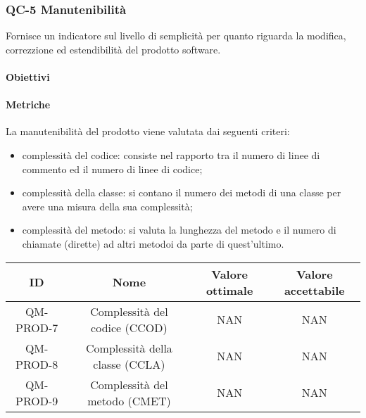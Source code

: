 \subsubsection{QC-5 Manutenibilità}
Fornisce un indicatore sul livello di semplicità per quanto riguarda la modifica, correzzione ed estendibilità del prodotto software.
	\paragraph{Obiettivi}
		
	\paragraph{Metriche}
	La manutenibilità del prodotto viene valutata dai seguenti criteri:
	\begin{itemize}
		\item complessità del codice: consiste nel rapporto tra il numero di linee di commento ed il numero di linee di codice;
		\item complessità della classe: si contano il numero dei metodi di una classe per avere una misura della sua complessità;
		\item complessità del metodo: si valuta la lunghezza del metodo e il numero di chiamate (dirette) ad altri metodoi da parte di quest'ultimo.
	\end{itemize}
	\begin{center}
		\begin{tabular}{|c|c|c|c|}
			\rowcolor{lighter-grayer}
			\hline
			ID & Nome & Valore ottimale & Valore accettabile \\
			\hline
			QM-PROD-7 & Complessità del codice (CCOD) & NAN & NAN \\
			\hline
			QM-PROD-8 & Complessità della classe (CCLA) & NAN & NAN \\
			\hline
			QM-PROD-9 & Complessità del metodo (CMET) & NAN & NAN \\
			\hline
		\end{tabular}
	\end{center}
